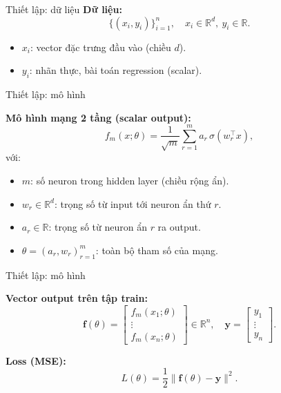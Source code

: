 \documentclass[12pt]{beamer}
\begin{document}
\begin{frame}{Thiết lập: dữ liệu}
  \textbf{Dữ liệu:}
  \[
    \{(x_i,y_i)\}_{i=1}^n,\quad x_i \in \mathbb R^d,\ y_i \in \mathbb R.
  \]
  \begin{itemize}
    \item $x_i$: vector đặc trưng đầu vào (chiều $d$).
    \item $y_i$: nhãn thực, bài toán regression (scalar).
  \end{itemize}

\end{frame}
\begin{frame}{Thiết lập: mô hình}
    
  \textbf{Mô hình mạng 2 tầng (scalar output):}
  \[
    f_m(x;\theta)
      = \frac{1}{\sqrt{m}} \sum_{r=1}^m a_r\,\sigma(w_r^\top x),
  \]
  với:
  \begin{itemize}
    \item $m$: số neuron trong hidden layer (chiều rộng ẩn).
    \item $w_r \in \mathbb R^d$: trọng số từ input tới neuron ẩn thứ $r$.
    \item $a_r \in \mathbb R$: trọng số từ neuron ẩn $r$ ra output.
    \item $\theta = (a_r, w_r)_{r=1}^m$: toàn bộ tham số của mạng.

  \end{itemize}
\end{frame}


  \begin{frame}{Thiết lập: mô hình}
      
  \textbf{Vector output trên tập train:}
  \[
    \mathbf f(\theta) =
    \begin{bmatrix}
      f_m(x_1;\theta)\\ \vdots \\ f_m(x_n;\theta)
    \end{bmatrix}
    \in \mathbb R^n,
    \quad
    \mathbf y =
    \begin{bmatrix}
      y_1\\ \vdots \\ y_n
    \end{bmatrix}.
  \]

  \textbf{Loss (MSE):}
  \[
    L(\theta) = \frac{1}{2}\|\mathbf f(\theta) - \mathbf y\|^2.
  \]
\end{frame}

\end{document}
